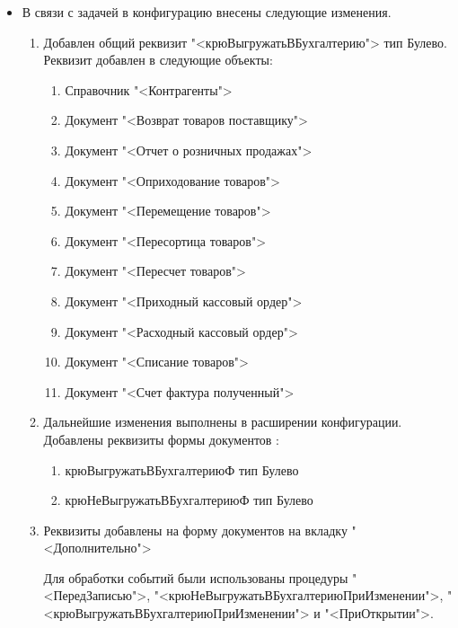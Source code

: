 \begin {itemize}
\begin{enumerate}
\begin{enumerate}[I]
		\item Пересчет товаров
		\item Списание товаров
		\item Приходный кассовый ордер
		\item Счет фактура полученный
	\end{enumerate}
\end{enumerate}
\item В связи с задачей в конфигурацию  внесены следующие изменения.
	\begin{enumerate}[I]
		\item Добавлен общий реквизит "<крюВыгружатьВБухгалтерию"> тип Булево. Реквизит добавлен в следующие объекты:
			\begin{enumerate}[I]
				\item Справочник "<Контрагенты">
				\item Документ "<Возврат товаров поставщику">
				\item Документ "<Отчет о розничных продажах">
				\item Документ "<Оприходование товаров">
				\item Документ "<Перемещение товаров">
				\item Документ "<Пересортица товаров">															
				\item Документ "<Пересчет товаров">															
				\item Документ "<Приходный кассовый ордер">															
				\item Документ "<Расходный кассовый ордер">															
				\item Документ "<Списание товаров">															
				\item Документ "<Счет фактура полученный">															
			\end{enumerate}
		\item Дальнейшие изменения выполнены в расширении конфигурации. Добавлены реквизиты формы документов :
			\begin{enumerate}[I]
				\item крюВыгружатьВБухгалтериюФ тип Булево
				\item крюНеВыгружатьВБухгалтериюФ тип Булево
			\end{enumerate}
		\item Реквизиты добавлены на форму документов на вкладку "<Дополнительно"> \par Для обработки событий были использованы процедуры "<ПередЗаписью">, "<крюНеВыгружатьВБухгалтериюПриИзменении">, "<крюВыгружатьВБухгалтериюПриИзменении"> и "<ПриОткрытии">.
		
\end{enumerate}
\end{itemize}

